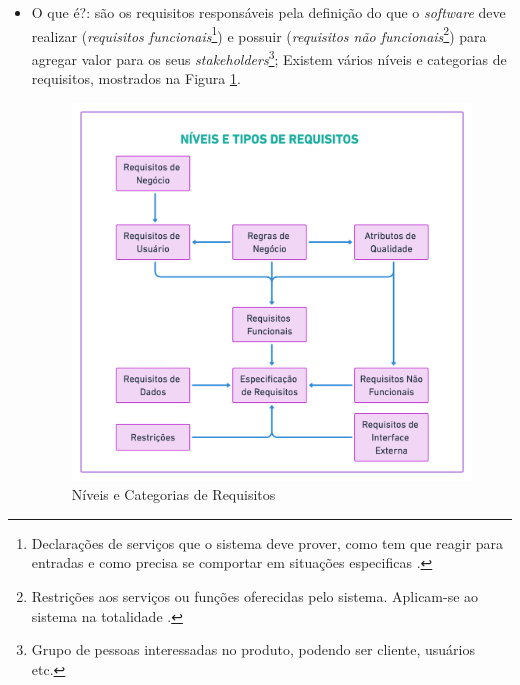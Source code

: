 \begin{itemize}
    \item O que é?: são os requisitos responsáveis pela definição do que o \textit{software} deve realizar (\textit{requisitos funcionais}\footnote{Declarações de serviços que o sistema deve prover, como tem que reagir para entradas e como precisa se comportar em situações especificas \cite{Sommerville10}.}) e possuir (\textit{requisitos não funcionais}\footnote{Restrições aos serviços ou funções oferecidas pelo sistema. Aplicam-se ao sistema na totalidade \cite{Sommerville10}.}) para agregar valor para os seus \textit{stakeholders}\footnote{Grupo de pessoas interessadas no produto, podendo ser cliente, usuários etc.}; Existem vários níveis e categorias de requisitos, mostrados na Figura \ref{lev_tipo_req}.
    
    \begin{figure}[htb]
        \begin{center}
            \caption{Níveis e Categorias de Requisitos}
            \label{lev_tipo_req}
            \includegraphics[scale=0.15]{figuras/Embasamento/lev_tipo_req.png}
        \end{center}
    \end{figure}
    
    \begin{itemize}
    

\end{itemize}
\end{itemize}
